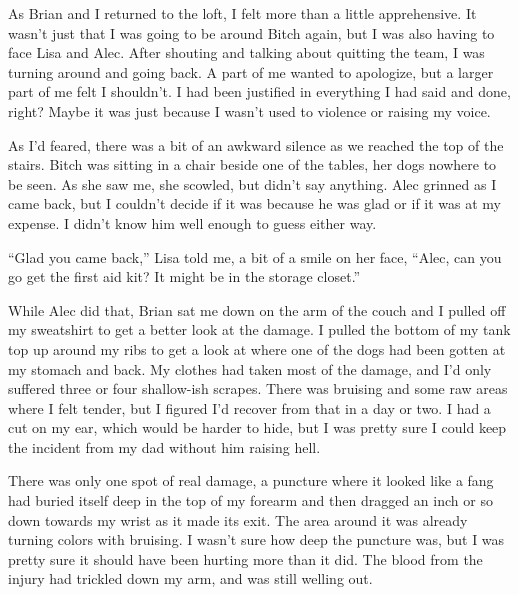 





As Brian and I returned to the loft, I felt more than a little apprehensive.  It wasn't just that I was going to be around Bitch again, but I was also having to face Lisa and Alec.  After shouting and talking about quitting the team, I was turning around and going back.  A part of me wanted to apologize, but a larger part of me felt I shouldn't.  I had been justified in everything I had said and done, right?  Maybe it was just because I wasn't used to violence or raising my voice.



As I'd feared, there was a bit of an awkward silence as we reached the top of the stairs.  Bitch was sitting in a chair beside one of the tables, her dogs nowhere to be seen.  As she saw me, she scowled, but didn't say anything.  Alec grinned as I came back, but I couldn't decide if it was because he was glad or if it was at my expense.  I didn't know him well enough to guess either way.



``Glad you came back,'' Lisa told me, a bit of a smile on her face, ``Alec, can you go get the first aid kit?  It might be in the storage closet.''



While Alec did that, Brian sat me down on the arm of the couch and I pulled off my sweatshirt to get a better look at the damage.  I pulled the bottom of my tank top up around my ribs to get a look at where one of the dogs had been gotten at my stomach and back.  My clothes had taken most of the damage, and I'd only suffered three or four shallow-ish scrapes.  There was bruising and some raw areas where I felt tender, but I figured I'd recover from that in a day or two. I had a cut on my ear, which would be harder to hide, but I was pretty sure I could keep the incident from my dad without him raising hell.



There was only one spot of real damage, a puncture where it looked like a fang had buried itself deep in the top of my forearm and then dragged an inch or so down towards my wrist as it made its exit.  The area around it was already turning colors with bruising.  I wasn't sure how deep the puncture was, but I was pretty sure it should have been hurting more than it did.  The blood from the injury had trickled down my arm, and was still welling out.



